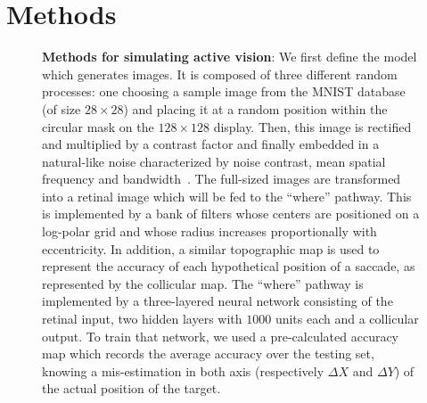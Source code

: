\section{Methods}
\label{sec:methods}
\begin{figure}[t!]%
\caption{%
{\bf Methods for simulating active vision}:
\A We first define the model which generates images. It is composed of three different random processes: one choosing a sample image from the MNIST database (of size $28\times 28$) and placing it at a random position within the circular mask on the $128\times 128$ display. Then, this image is rectified and multiplied by a contrast factor and finally embedded in a natural-like noise characterized by noise contrast, mean spatial frequency and bandwidth~\citep{Sanz12}. %
\B The full-sized images are transformed into a retinal image which will be fed to the ``where'' pathway. This is implemented by a bank of filters whose centers are positioned on a log-polar grid and whose radius increases proportionally with eccentricity. In addition, a similar topographic map is used to represent the accuracy of each hypothetical position of a saccade, as represented by the collicular map. %
\ICANN
\C The ``where'' pathway is implemented by a three-layered neural network consisting of the retinal input, two hidden layers with $1000$ units each and a collicular output. To train that network, we used a pre-calculated accuracy map which records the average accuracy over the testing set, knowing a mis-estimation in both axis (respectively $\Delta X$ and  $\Delta Y$) of the actual position of the target. %
}
\end{figure}
